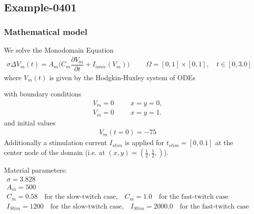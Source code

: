 %
\clearpage
%
\subsection{Example-0401}
%
%
\subsubsection{Mathematical model}
%
We solve the Monodomain Equation
%
\begin{align}
    \sigma \Delta V_m(t) = A_m\Big(C_m \dfrac{\partial V_m}{\partial t} + I_{ionic}(V_m)\Big) & &&\Omega = [0, 1] \times [0, 1], \quad t \in [0, 3.0]
\end{align}
%
where $V_m(t)$ is given by the Hodgkin-Huxley system of ODEs

with boundary conditions
%
\begin{align}
    V_m = 0 & &&x = y = 0, \\
    V_m = 0 & &&x = y = 1.
\end{align}
and initial values 
%
\begin{equation*}
  \begin{array}{lll}
    V_m(t=0) = -75
  \end{array}
\end{equation*}
%
Additionally a stimulation current $I_{stim}$ is applied for $t_{stim} = [0, 0.1]$ at the center node of the domain (i.e. at $(x,y) = (\frac12, \frac12,)$).
%

Material parameters:
\begin{equation*}
  \begin{array}{lll}
    \sigma = 3.828\\[4mm]
    A_m = 500\\[4mm]
    C_m = 0.58 \quad \text{for the slow-twitch case,} \quad C_m = 1.0 \quad \text{for the fast-twitch case}\\[4mm]
    I_{Stim} = 1200 \quad \text{for the slow-twitch case,} \quad I_{Stim} = 2000.0 \quad \text{for the fast-twitch case}\\[4mm]    
  \end{array}
\end{equation*}
%
%
